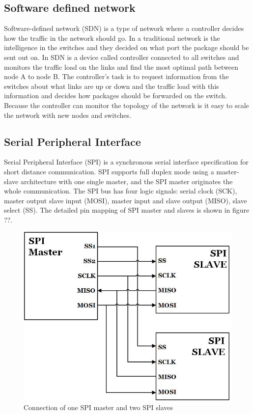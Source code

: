 \documentclass[11pt, titlepage]{article} %
\begin{document}
\subsection{Software defined network}
Software-defined network (SDN) is a type of network where a controller decides how the traffic in the network should go. In a traditional network is the intelligence in the switches and they decided on what port the package should be sent out on. In SDN is a device called controller connected to all switches and monitors the traffic load on the links and find the most optimal path between node A to node B. The controller’s task is to request information from the switches about what links are up or down and the traffic load with this information and decides how packages should be forwarded on the switch. Because the controller can monitor the topology of the network is it easy to scale the network with new nodes and switches\cite{doi:10.1002/sec.1737}. 


\subsection{Serial Peripheral Interface}
Serial Peripheral Interface (SPI) is a synchronous serial interface specification for short distance communication. SPI supports full duplex mode using a master-slave architecture with one single master, and the SPI master originates the whole communication. The SPI bus has four logic signals: serial clock (SCK), master output slave input (MOSI), master input and slave output (MISO), slave select (SS). The detailed pin mapping of SPI master and slaves is shown in figure ??.

\begin{figure}[H]
	\centering
   	\includegraphics[scale=0.5]{spi-literature.jpg}
   	\caption{Connection of one SPI master and two SPI slaves}
    \label{fig:spi-literature}
\end{figure}
\end{document}
